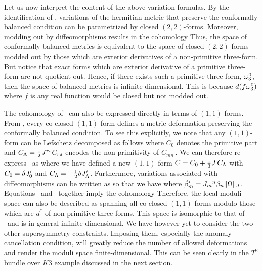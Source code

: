 Let us now interpret the content of the above variation formulas.
By the identification of \Jrho, variations of the hermitian metric
that preserve the conformally balanced condition can be
parametrized by closed $(2,2)$-forms.  Moreover, modding out by
diffeomorphisms results in the cohomology
\eqn{} Thus, the space of conformally balanced metrics is
equivalent to the space of closed $(2,2)$-forms modded out by
those which are exterior derivatives of a non-primitive
three-form.  But notice that exact forms which are exterior
derivative of a primitive three-form are not quotient out. Hence,
if there exists such a primitive three-form, $\omega_3^0$, then the
space of balanced metrics is infinite dimensional.  This is
because $d(f\omega_3^0)$ where $f$ is any real function would be
closed but not modded out.

The cohomology of \balcohfour\ can also be expressed directly in
terms of $(1,1)$-forms. From \confbalt, every co-closed
$(1,1)$-form defines a metric deformation preserving the
conformally balanced condition. To see this explicitly, we note
that any $(1,1)$-form can be Lefschetz decomposed as follows
\eqn{}
where $C_0$ denotes the primitive part and $C_\Lambda={1 \over 2}
J^{rs}C_{rs}$ encodes the non-primitivity of $C_{mn}\,$.  We can
therefore re-express \confbalt\ as \eqn{} where we have defined a
new $(1,1)$-form $C=C_0 + {1 \over 3} J\, C_\Lambda$ with $C_0=\delta
J'_0$ and $C_\Lambda=-{1 \over 2} \delta J'_\Lambda$.  Furthermore, variations
associated with diffeomorphisms can be written as
\eqn{} so that we
have \eqn{} where ${\tilde \beta}'_m = J_m{}^n \beta_n \|\Omega\|_J$.
Equations \confbalts\ and \diffeomtwo\ together imply the
cohomology \eqn{} Therefore, the local moduli space can also be
described as spanning all co-closed $(1,1)$-forms modulo those
which are $d^*$ of non-primitive three-forms. This space is
isomorphic to that of \balcohfour\ and is in general
infinite-dimensional. We have however yet to consider the two
other supersymmetry constraints. Imposing them, especially the
anomaly cancellation condition, will greatly reduce the number of
allowed deformations and render the moduli space
finite-dimensional.  This can be seen clearly in the $T^2$ bundle over $K3$ example
discussed in the next section.

